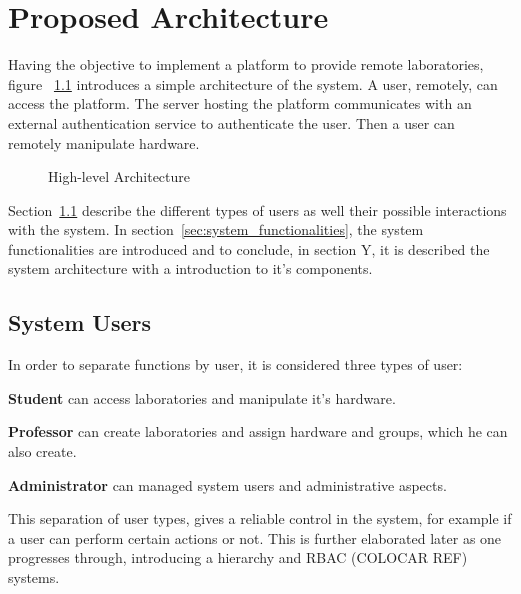 %
%
\chapter{Proposed Architecture} \label{cap:proposed-architecture}

Having the objective to implement a platform to provide remote laboratories, figure ~\ref{fig:architecture} introduces a simple architecture of the system. A user, remotely, can access the platform. The server hosting the platform communicates with an external authentication service to authenticate the user. Then a user can remotely manipulate hardware. 

\vspace{5mm}

\begin{figure}[H]
    \centering
    
\caption{High-level Architecture}
\label{fig:architecture}
\end{figure}

Section~\ref{sec:user_role} describe the different types of users as well their possible interactions with the system. In section~\ref{sec:system_functionalities}, the system functionalities are introduced and to conclude, in section Y, it is described the system architecture with a introduction to it's components. 

\section{System Users} \label{sec:user_role}
In order to separate functions by user, it is considered three types of user:

\begin{description}
    \item \textbf{Student} can access laboratories and manipulate it's hardware. 
    \item \textbf{Professor} can create laboratories and assign hardware and groups, which he can also create.
    \item \textbf{Administrator} can managed system users and administrative aspects.
\end{description}

This separation of user types, gives a reliable control in the system, for example if a user can perform certain actions or not. This is further elaborated later as one progresses through, introducing a hierarchy and RBAC (COLOCAR REF) systems.

